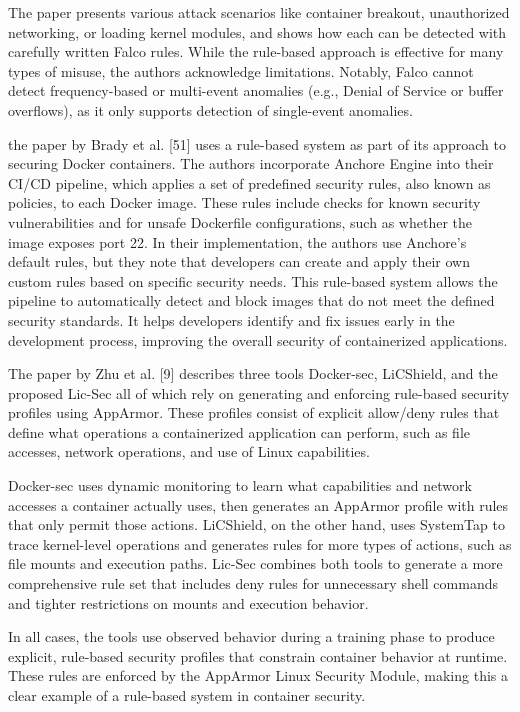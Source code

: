 \documentclass[12pt]{report}
\begin{document}
\begin{doublespace}
The paper presents various attack scenarios like container breakout, unauthorized networking, or loading kernel modules, and shows how each can be detected with carefully written Falco rules. While the rule-based approach is effective for many types of misuse, the authors acknowledge limitations. Notably, Falco cannot detect frequency-based or multi-event anomalies (e.g., Denial of Service or buffer overflows), as it only supports detection of single-event anomalies.

the paper by Brady et al. [51] uses a rule-based system as part of its approach to securing Docker containers. The authors incorporate Anchore Engine into their CI/CD pipeline, which applies a set of predefined security rules, also known as policies, to each Docker image. These rules include checks for known security vulnerabilities and for unsafe Dockerfile configurations, such as whether the image exposes port 22. In their implementation, the authors use Anchore's default rules, but they note that developers can create and apply their own custom rules based on specific security needs. This rule-based system allows the pipeline to automatically detect and block images that do not meet the defined security standards. It helps developers identify and fix issues early in the development process, improving the overall security of containerized applications.

The paper by Zhu et al. [9] describes three tools Docker-sec, LiCShield, and the proposed Lic-Sec all of which rely on generating and enforcing rule-based security profiles using AppArmor. These profiles consist of explicit allow/deny rules that define what operations a containerized application can perform, such as file accesses, network operations, and use of Linux capabilities.

Docker-sec uses dynamic monitoring to learn what capabilities and network accesses a container actually uses, then generates an AppArmor profile with rules that only permit those actions. LiCShield, on the other hand, uses SystemTap to trace kernel-level operations and generates rules for more types of actions, such as file mounts and execution paths. Lic-Sec combines both tools to generate a more comprehensive rule set that includes deny rules for unnecessary shell commands and tighter restrictions on mounts and execution behavior.

In all cases, the tools use observed behavior during a training phase to produce explicit, rule-based security profiles that constrain container behavior at runtime. These rules are enforced by the AppArmor Linux Security Module, making this a clear example of a rule-based system in container security.


\end{doublespace}
\end{document}
